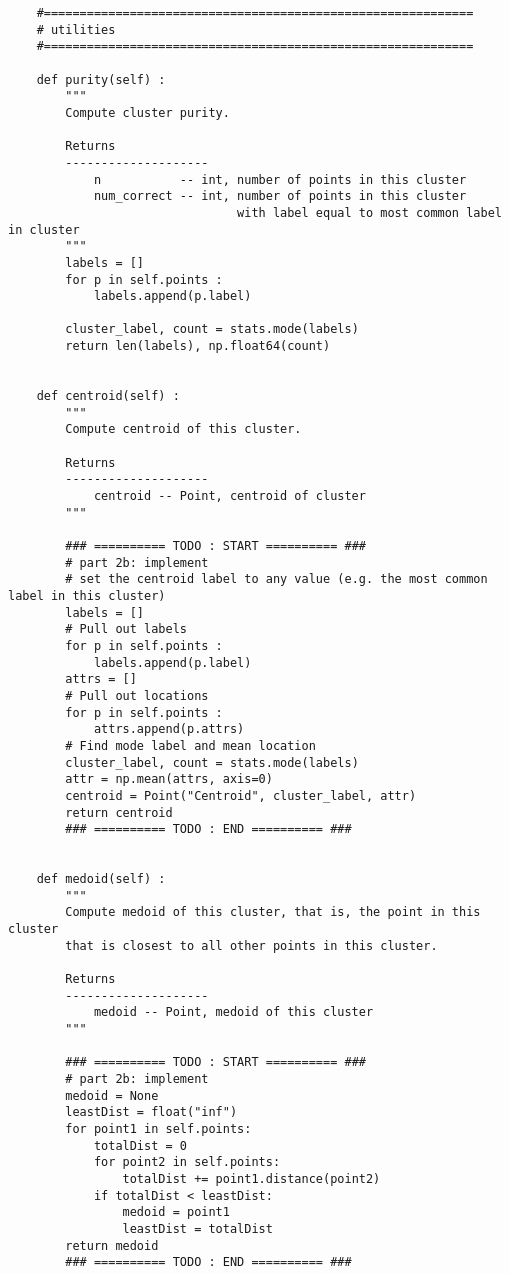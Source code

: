 \documentclass[11pt]{article}
\begin{document}
\begin{verbatim}
    #============================================================
    # utilities
    #============================================================
    
    def purity(self) :
        """
        Compute cluster purity.
        
        Returns
        --------------------
            n           -- int, number of points in this cluster
            num_correct -- int, number of points in this cluster
                                with label equal to most common label in cluster
        """        
        labels = []
        for p in self.points :
            labels.append(p.label)
        
        cluster_label, count = stats.mode(labels)
        return len(labels), np.float64(count)
    
    
    def centroid(self) :
        """
        Compute centroid of this cluster.
        
        Returns
        --------------------
            centroid -- Point, centroid of cluster
        """
        
        ### ========== TODO : START ========== ###
        # part 2b: implement
        # set the centroid label to any value (e.g. the most common label in this cluster)
        labels = []
        # Pull out labels
        for p in self.points :
            labels.append(p.label)
        attrs = []
        # Pull out locations
        for p in self.points :
            attrs.append(p.attrs)
        # Find mode label and mean location
        cluster_label, count = stats.mode(labels)
        attr = np.mean(attrs, axis=0)
        centroid = Point("Centroid", cluster_label, attr)
        return centroid
        ### ========== TODO : END ========== ###
    
    
    def medoid(self) :
        """
        Compute medoid of this cluster, that is, the point in this cluster
        that is closest to all other points in this cluster.
        
        Returns
        --------------------
            medoid -- Point, medoid of this cluster
        """
        
        ### ========== TODO : START ========== ###
        # part 2b: implement
        medoid = None
        leastDist = float("inf")
        for point1 in self.points:
            totalDist = 0
            for point2 in self.points:
                totalDist += point1.distance(point2)
            if totalDist < leastDist:
                medoid = point1
                leastDist = totalDist
        return medoid
        ### ========== TODO : END ========== ###
    

\end{verbatim}
\end{document}
